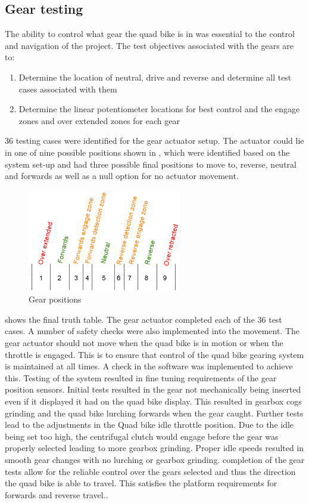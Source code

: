\documentclass[main.tex]{subfiles}
\begin{document}
\subsection{Gear testing}
The ability to control what gear the quad bike is in was essential to the control and navigation of the project. The test objectives associated with the gears are to:
\begin{enumerate}
\item Determine the location of neutral, drive and reverse and determine all test cases associated with them
\item Determine the linear potentiometer locations for best control and the engage zones and over extended zones for each gear
\end{enumerate}
36 testing cases were identified for the gear actuator setup. The actuator could lie in one of nine possible positions shown in , which were identified based on the system set-up and had three possible final positions to move to, reverse, neutral and forwards as well as a null option for no actuator movement. 
\begin{figure}[ht]
\includegraphics[width=0.6\textwidth]{5-Testing/gearDiagram.png}
\centering
\caption[Gear positions]{Gear positions}
\end{figure}
 shows the final truth table. The gear actuator completed each of the 36 test cases. A number of safety checks were also implemented into the movement. The gear actuator should not move when the quad bike is in motion or when the throttle is engaged. This is to ensure that control of the quad bike gearing system is maintained at all times.  A check in the software was implemented to achieve this. Testing of the system resulted in fine tuning requirements of the gear position sensors. Initial tests resulted in the gear not mechanically being inserted even if it displayed it had on the quad bike display. This resulted in gearbox cogs grinding and the quad bike lurching forwards when the gear caught. Further tests lead to the adjustments in the Quad bike idle throttle position. Due to the idle being set too high, the centrifugal clutch would engage before the gear was properly selected leading to more gearbox grinding. Proper idle speeds resulted in smooth gear changes with no lurching or gearbox grinding.
completion of the gear tests allow for the reliable control over the gears selected and thus the direction the quad bike is able to travel. This satisfies the platform requirements for forwards and reverse travel..
\end{document}
